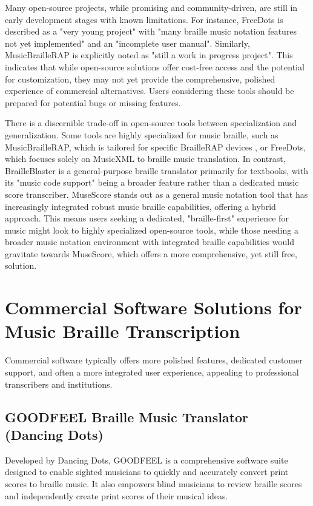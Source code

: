 Many open-source projects, while promising and community-driven, are still in early development stages with known limitations. For instance, FreeDots is described as a "very young project" with "many braille music notation features not yet implemented" and an "incomplete user manual". \cite{freedots-blindguru} Similarly, MusicBrailleRAP is explicitly noted as "still a work in progress project". \cite{musicbraillerap-github} This indicates that while open-source solutions offer cost-free access and the potential for customization, they may not yet provide the comprehensive, polished experience of commercial alternatives. Users considering these tools should be prepared for potential bugs or missing features.

There is a discernible trade-off in open-source tools between specialization and generalization. Some tools are highly specialized for music braille, such as MusicBrailleRAP, which is tailored for specific BrailleRAP devices \cite{musicbraillerap-github}, or FreeDots, which focuses solely on MusicXML to braille music translation. \cite{freedots-blindguru} In contrast, BrailleBlaster is a general-purpose braille translator primarily for textbooks, with its "music code support" being a broader feature rather than a dedicated music score transcriber. \cite{brailleblaster-product} MuseScore stands out as a general music notation tool that has increasingly integrated robust music braille capabilities, offering a hybrid approach. This means users seeking a dedicated, "braille-first" experience for music might look to highly specialized open-source tools, while those needing a broader music notation environment with integrated braille capabilities would gravitate towards MuseScore, which offers a more comprehensive, yet still free, solution.

\section{Commercial Software Solutions for Music Braille Transcription}

Commercial software typically offers more polished features, dedicated customer support, and often a more integrated user experience, appealing to professional transcribers and institutions.

\subsection{GOODFEEL Braille Music Translator (Dancing Dots)}
Developed by Dancing Dots, GOODFEEL is a comprehensive software suite designed to enable sighted musicians to quickly and accurately convert print scores to braille music. It also empowers blind musicians to review braille scores and independently create print scores of their musical ideas. \cite{dancingdots-goodfeel, dancingdots-products}


